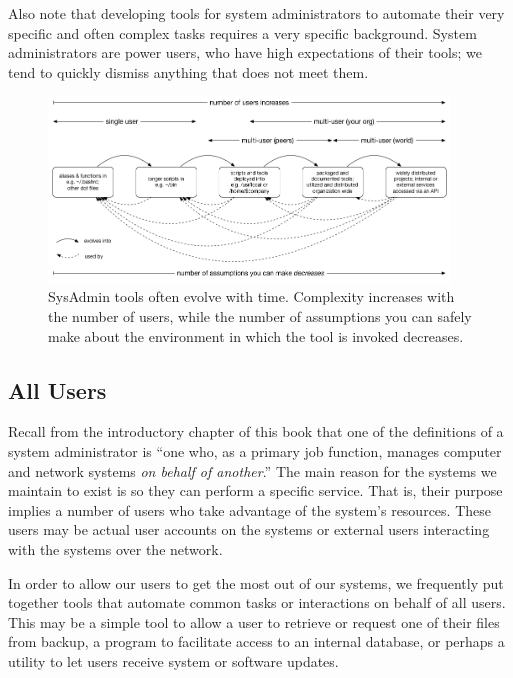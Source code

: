 Also note that developing tools for system
administrators to automate their very specific and
often complex tasks requires a very specific
background.  System administrators are power users,
who have high expectations of their tools; we tend
to quickly dismiss anything that does not meet them.

\begin{figure}[!t]
	\centering
	\includegraphics[width=0.95\textwidth]{08/pics/tools-evolution}
		\caption[Evolution of SysAdmin Tools]{
			SysAdmin tools often evolve with time.
			Complexity increases with the
			number of users, while the
			number of assumptions you can
			safely make about the
			environment in which the tool
			is invoked decreases.
			\label{fig:automation:tools-evolution}}
\end{figure}


\subsection{All Users}
\label{automation:who-benefits:all-users}

Recall from the introductory chapter of this book that
one of the definitions of a system administrator is
``one who, as a primary job function, manages computer
and network systems {\em on behalf of another}.'' The
main reason for the systems we maintain to exist is so
they can perform a specific service.  That is, their
purpose implies a number of users who take advantage
of the system's resources.  These users may be actual
user accounts on the systems or external users
interacting with the systems over the network.

In order to allow our users to get the most out of our
systems, we frequently put together tools that
automate common tasks or interactions on behalf of all
users.  This may be a simple tool to allow a user to
retrieve or request one of their files from backup, a
program to facilitate access to an internal database,
or perhaps a utility to let users receive system or
software updates.

